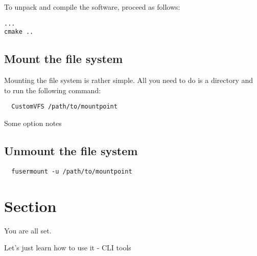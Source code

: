 To unpack and compile the software, proceed as follows:

\begin{Verbatim}
...
cmake ..
\end{Verbatim}

\subsection*{Mount the file system}

Mounting the file system is rather simple.
All you need to do is a directory and to run the following command:

\begin{Verbatim}
  CustomVFS /path/to/mountpoint
\end{Verbatim}

Some option notes

\subsection*{Unmount the file system}

\begin{Verbatim}
  fusermount -u /path/to/mountpoint
\end{Verbatim}

\section*{Section}

You are all set.

Let's just learn how to use it - CLI tools